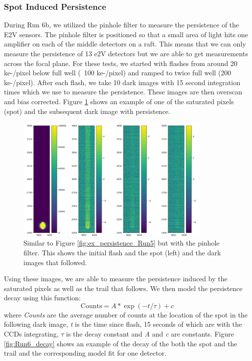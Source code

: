 \documentclass[DM,authoryear,toc]{lsstdoc}
\begin{document}
\subsubsection{Spot Induced Persistence}
During Run 6b, we utilized the pinhole filter to measure the persistence of the E2V sensors.
The pinhole filter is positioned so that a small area of light hits one amplifier on each of the middle detectors on a raft.
This means that we can only measure the persistence of 13 e2V detectors but we are able to get measurements across the focal plane.
For these tests, we started with flashes from around 20 ke-/pixel below full well (~100 ke-/pixel) and ramped to twice full well (200 ke-/pixel).
After each flash, we take 10 dark images with 15 second integration times which we use to measure the persistence.
These images are then overscan and bias corrected.
Figure \ref{fig:Run6_example} shows an example of one of the saturated pixels (spot) and the subsequent dark image with persistence.

\begin{figure}[!htp]
  \centering
  \includegraphics[width=0.85\textwidth, angle=0]{Run6_ex.png}
  \caption{
  Similar to Figure \ref{fig:ex_persistence_Run5} but with the pinhole filter. 
  This shows the initial flash and the spot (left) and the dark images that followed.
  }\label{fig:Run6_example}
\end{figure}


Using these images, we are able to measure the persistence induced by the saturated pixels as well as the trail that follows.
We then model the persistence decay using this function:
\begin{equation*}
  \textrm{Counts}= A * \exp(-t/\tau)+c
\end{equation*}
where \textit{Counts} are the average number of counts at the location of the spot in the following dark image, \textit{t} is the time since flash, 15 seconds of which are with the CCDs integrating, \textit{$\tau$} is the decay constant and \textit{A} and \textit{c} are constants.
Figure \ref{fig:Run6_decay} shows an example of the decay of the both the spot and the trail and the corresponding model fit for one detector.
\end{document}
